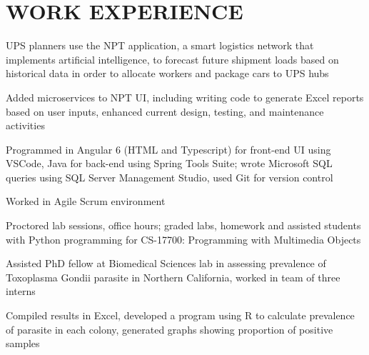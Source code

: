 \documentclass[]{deedy-resume-openfont}
\begin{document}
\hfill
\begin{minipage}[t]{0.67\textwidth} 


\section{WORK EXPERIENCE}

\vspace{\topsep} %
\begin{tightemize}
\item UPS planners use the NPT application, a smart logistics network that implements artificial intelligence, to forecast future shipment loads based on historical data in order to allocate workers and package cars to UPS hubs
\item Added microservices to NPT UI, including writing code to generate Excel reports based on user inputs, enhanced current design, testing, and maintenance activities
\item Programmed in Angular 6 (HTML and Typescript) for front-end UI using VSCode, Java for back-end using Spring Tools Suite; wrote Microsoft SQL queries using SQL Server Management Studio, used Git for version control
\item Worked in Agile Scrum environment
\end{tightemize}
\sectionsep

\vspace{\topsep} %
\begin{tightemize}
\item Proctored lab sessions, office hours; graded labs, homework and assisted students with Python programming for CS-17700: Programming with Multimedia Objects
\end{tightemize}
\sectionsep

\vspace{\topsep} %
\begin{tightemize}
\item Assisted PhD fellow at Biomedical Sciences lab in assessing prevalence of Toxoplasma Gondii parasite in Northern California, worked in team of three interns
\item Compiled results in Excel, developed a program using R to calculate prevalence of parasite in each colony, generated graphs showing proportion of positive samples
\end{tightemize}
\sectionsep


\end{minipage}
\end{document}
